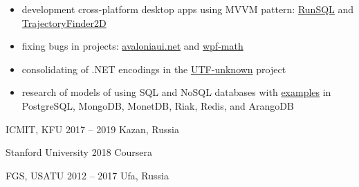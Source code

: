 \documentclass[10pt,a4paper,ragged2e,withhyper]{altacv}
\begin{document}
\begin{paracol}{2}
\begin{itemize}
  \item development cross-platform desktop apps using MVVM pattern:
  \newline \href{https://github.com/rstm-sf/RunSQL}{RunSQL}
  and \href{https://github.com/rstm-sf/TrajectoryFinder2D}{TrajectoryFinder2D}
  \smallskip

  \item fixing bugs in projects:
  \href{https://github.com/AvaloniaUI/avaloniaui.net/commits?author=rstm-sf}{avaloniaui.net}
  and \href{https://github.com/ForNeVeR/wpf-math/commits?author=rstm-sf}{wpf-math}
  \smallskip

  \item consolidating of .NET encodings in the
  \href{https://github.com/CharsetDetector/UTF-unknown/commits?author=rstm-sf}{UTF-unknown} project
  \smallskip

  \item research of models of using SQL and NoSQL databases with
  \href{https://bitbucket.org/rstm-sf/game_with_db}{examples}
  in PostgreSQL, MongoDB, MonetDB, Riak, Redis, and ArangoDB

\end{itemize}

\switchcolumn




\smallskip
{}


{ICMIT, KFU}
{2017 -- 2019}
{Kazan, Russia}

\divider

{Stanford University}
{2018}
{Coursera}

\divider

{FGS, USATU}
{2012 -- 2017}
{Ufa, Russia}


\nocite{*}

\printbibliography[heading=pubtype,title={\printinfo{\faUsers}{Conference Proceedings}},type=inproceedings]

\end{paracol}
\end{document}
